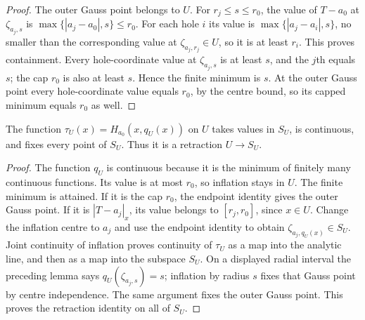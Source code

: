 \begin{proof}
The outer Gauss point belongs to $U$. For $r_j\le s\le r_0$, the value of
$T-a_0$ at $\zeta_{a_j,s}$ is $\max\{|a_j-a_0|,s\}\le r_0$.
For each hole $i$ its value is $\max\{|a_j-a_i|,s\}$, no smaller than the
corresponding value at $\zeta_{a_j,r_j}\in U$, so it is at least $r_i$.
This proves containment. Every hole-coordinate value at $\zeta_{a_j,s}$
is at least $s$, and the $j$th equals $s$; the cap $r_0$ is also at least
$s$. Hence the finite minimum is $s$. At the outer Gauss point every
hole-coordinate value equals $r_0$, by the centre bound, so its capped
minimum equals $r_0$ as well.
\end{proof}

\begin{theorem}\label{thm:fc-radial-retraction}
\leanok
{}
The function $\tau_U(x)=H_{a_0}(x,q_U(x))$ on $U$ takes values in $S_U$,
is continuous, and fixes every point of $S_U$. Thus it is a retraction
$U\to S_U$.
\end{theorem}

\begin{proof}
The function $q_U$ is continuous because it is the minimum of finitely many
continuous functions. Its value is at most $r_0$, so inflation stays in $U$.
The finite minimum is attained. If it is the cap $r_0$, the endpoint identity
gives the outer Gauss point. If it is $|T-a_j|_x$, its value belongs to
$[r_j,r_0]$, since $x\in U$. Change the inflation centre to $a_j$ and use
the endpoint identity to obtain $\zeta_{a_j,q_U(x)}\in S_U$.
Joint continuity of inflation proves continuity of $\tau_U$ as a map into
the analytic line, and then as a map into the subspace $S_U$.
On a displayed radial interval the preceding lemma says $q_U(\zeta_{a_j,s})=s$;
inflation by radius $s$ fixes that Gauss point by centre independence.
The same argument fixes the outer Gauss point. This proves the retraction
identity on all of $S_U$.
\end{proof}
